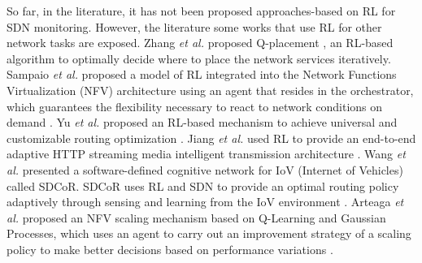 So far, in the literature, it has not been proposed approaches-based on RL for SDN monitoring. However, the literature some works that use RL for other network tasks are exposed. Zhang \textit{et al.} proposed Q-placement \cite{zhang_2018-Q-placement}, an RL-based algorithm to optimally decide where to place the network services iteratively. Sampaio \textit{et al.} proposed a model of RL integrated into the Network Functions Virtualization (NFV) architecture using an agent that resides in the orchestrator, which guarantees the flexibility necessary to react to network conditions on demand \cite{sampaio_2018:using-nfv-rl}. Yu \textit{et al.} proposed an RL-based mechanism to achieve universal and customizable routing optimization \cite{yu_2018:drom}. Jiang \textit{et al.} used RL to provide an end-to-end adaptive HTTP  streaming media intelligent transmission architecture \cite{jiang_2018:q-fdba}. Wang \textit{et al.} presented a software-defined cognitive network for IoV (Internet of Vehicles) called SDCoR. SDCoR uses RL and SDN to provide an optimal routing policy adaptively through sensing and learning from the IoV environment \cite{Wang_2018:SDCoR}. Arteaga \textit{et al.} proposed an NFV scaling mechanism based on Q-Learning and Gaussian Processes, which uses an agent to carry out an improvement strategy of a scaling policy to make better decisions based on performance variations \cite{arteaga_2017:adaptive-scaling}.